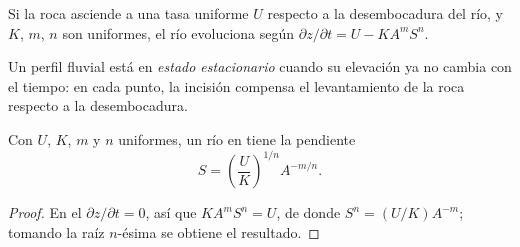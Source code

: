 Si la roca asciende a una tasa uniforme $U$ respecto a la desembocadura del río, y $K$,
$m$, $n$ son uniformes, el río evoluciona según $\partial z/\partial t = U - K A^m
S^n$.

\begin{definition}\label{def:b3:quantitative-geomorphology:steady-profile}
Un perfil fluvial está en \emph{estado estacionario}
cuando su elevación ya no cambia con el tiempo: en cada punto, la incisión
compensa el levantamiento de la roca respecto a la desembocadura.
\end{definition}

\begin{theorem}\label{thm:b3:quantitative-geomorphology:steady}
Con $U$, $K$, $m$ y $n$ uniformes, un río  en  tiene la pendiente
\[
S = \left(\frac{U}{K}\right)^{1/n} A^{-m/n} .
\]
\end{theorem}

\begin{proof}
En el  $\partial z/\partial t = 0$, así que $K A^m S^n = U$, de donde $S^n
= (U/K)A^{-m}$; tomando la raíz $n$-ésima se obtiene el resultado.
\end{proof}

